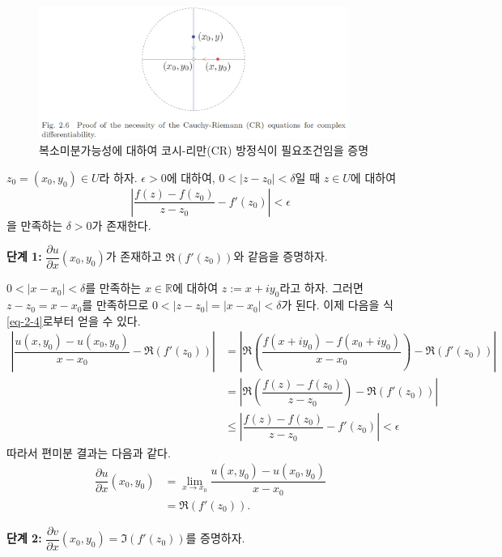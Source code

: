 \begin{figure}[!h]
\begin{center}
\includegraphics[width=0.9\textwidth]{./SaltChapter/fig-2-6}
\end{center}
\caption{복소미분가능성에 대하여 코시-리만(CR) 방정식이 필요조건임을 증명}
\label{fig-2-6}
\end{figure}

$z_0 = (x_0, y_0)\in U$라 하자.
$\epsilon>0$에 대하여, 
$0<|z-z_0|<\delta$일 때 $z\in U$에 대하여
\begin{equation}\label{eq-2-4}
\left| \dfrac{f(z)-f(z_0)}{z-z_0} - f'(z_0) \right| < \epsilon
\end{equation}
을 만족하는 $\delta >0$가 존재한다.

{\bf 단계 1:}
$\dfrac{\partial u}{\partial x}(x_0,y_0)$가 존재하고 $\Re(f'(z_0))$와 같음을 증명하자.

$0<|x-x_0|<\delta$를 만족하는 $x\in\mathbb R$에 대하여 $z:=x+iy_0$라고 하자.
그러면 $z-z_0 = x-x_0$를 만족하므로
$0<|z-z_0| = |x-x_0| < \delta$가 된다.
이제 다음을 식 \eqref{eq-2-4}로부터 얻을 수 있다. 
\begin{align*}
\left| \dfrac{u(x,y_0) - u(x_0, y_0)}{x-x_0} - \Re(f'(z_0)) \right| 
&= \left| \Re\left(\dfrac{f(x+iy_0)-f(x_0+iy_0)}{x-x_0}\right) - \Re(f'(z_0)) \right| \\
&= \left| \Re\left(\dfrac{f(z)-f(z_0)}{z-z_0}\right) - \Re(f'(z_0)) \right| \\
&\le \left| \dfrac{f(z)-f(z_0)}{z-z_0} - f'(z_0) \right| < \epsilon 
\end{align*}
따라서 편미분 결과는 다음과 같다.
\begin{align*}
\dfrac{\partial u}{\partial x}(x_0, y_0) 
&= \lim_{x\to x_0} \dfrac{u(x,y_0) - u(x_0, y_0)}{x-x_0} \\
&= \Re(f'(z_0)).
\end{align*}

{\bf 단계 2:}
$\dfrac{\partial v}{\partial x}(x_0, y_0)  = \Im(f'(z_0))$를 증명하자.

